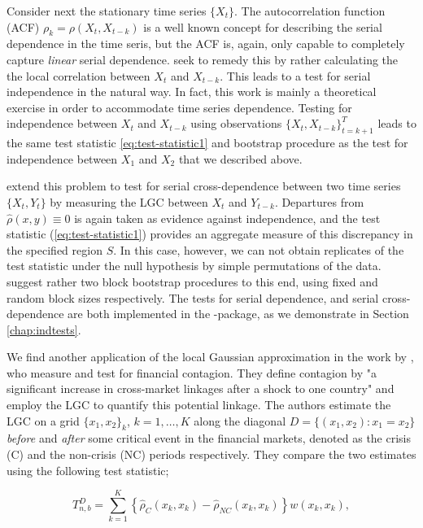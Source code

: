Consider next the stationary time series $\{X_t\}$. The autocorrelation function (ACF) $\rho_k = \rho(X_t, X_{t-k})$ is a well known concept for describing the serial dependence in the time seris, but the ACF is, again, only capable to completely capture \emph{linear} serial dependence. \citet{laca:tjos:2017} seek to remedy this by rather calculating the the local correlation between $X_t$ and $X_{t-k}$. This leads to a test for serial independence in the natural way. In fact, this work is mainly a theoretical exercise in order to accommodate time series dependence. Testing for independence between $X_t$ and $X_{t-k}$ using observations $\{X_t, X_{t-k}\}_{t = k+1}^T$ leads to the same test statistic \eqref{eq:test-statistic1} and bootstrap procedure as the test for independence between $X_1$ and $X_2$ that we described above. 

\citet{laca:tjos:2018} extend this problem to test for serial cross-dependence between two time series $\{X_t, Y_t\}$ by measuring the LGC between $X_t$ and $Y_{t-k}$. Departures from $\widehat\rho(x,y) \equiv 0$ is again taken as evidence against independence, and the test statistic (\ref{eq:test-statistic1}) provides an aggregate measure of this discrepancy in the specified region $S$. In this case, however, we can not obtain replicates of the test statistic under the null hypothesis by simple permutations of the data. \citet{laca:tjos:2018} suggest rather two block bootstrap procedures to this end, using fixed and random block sizes respectively. The tests for serial dependence, and serial cross-dependence are both implemented in the -package, as we demonstrate in Section \ref{chap:indtests}.

We find another application of the local Gaussian approximation in the work by \citet{stov:tjos:huft:2014}, who measure and test for financial contagion. They define contagion by "a significant increase in cross-market linkages after a shock to one country" \citep{forb:rigo:2002} and employ the LGC to quantify this potential linkage. The authors estimate the LGC on a grid $\{x_1, x_2\}_k$, $k=1,\ldots,K$ along the diagonal $D=\{(x_1,x_2): x_1 = x_2\}$ \emph{before} and \emph{after} some critical event in the financial markets, denoted as the crisis (C) and the non-crisis (NC) periods respectively. They compare the two estimates using the following test statistic; 

$$T_{n,b}^D = \sum_{k=1}^K \left\{\widehat\rho_C(x_k, x_k) - \widehat\rho_{NC}(x_k, x_k) \right\}w(x_k,x_k),$$

